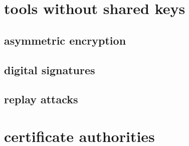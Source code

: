 \section{tools without shared keys}

\subsection{asymmetric encryption}



\subsection{digital signatures}



% 

\subsection{replay attacks}





% 


\section{certificate authorities}


% 

